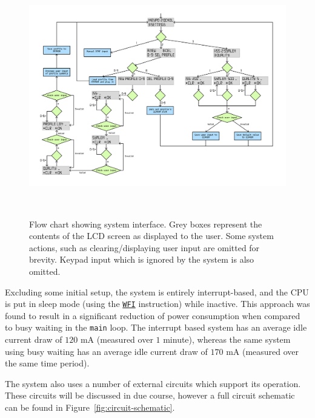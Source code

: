 \documentclass[11pt,a4paper,twocolumn]{scrartcl}
\begin{document}
   \begin{figure}
      \centering
      \includegraphics[height=0.67\textheight, angle=90]{system_flow_chart}
      \caption{Flow chart showing system interface. Grey boxes represent the contents of the LCD screen as displayed to the user. Some system actions, such as clearing/displaying user input are omitted for brevity. Keypad input which is ignored by the system is also omitted.}~\label{fig:system-interface}
   \end{figure}

   Excluding some initial setup, the system is entirely interrupt-based, and the CPU is put in sleep mode (using the \href{https://developer.arm.com/documentation/dui0473/m/arm-and-thumb-instructions/wfi}{\Verb!WFI!} instruction) while inactive. This approach was found to result in a significant reduction of power consumption when compared to busy waiting in the \verb!main! loop. The interrupt based system has an average idle current draw of $120$ mA (measured over $1$ minute), whereas the same system using busy waiting has an average idle current draw of $170$ mA (measured over the same time period).

   The system also uses a number of external circuits which support its operation. These circuits will be discussed in due course, however a full circuit schematic can be found in Figure~\ref{fig:circuit-schematic}.
\end{document}
